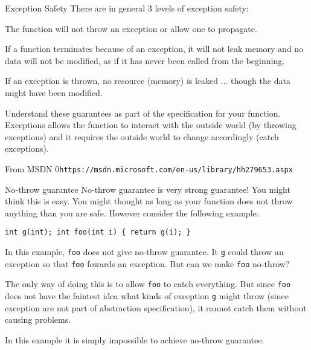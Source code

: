 \begin{frame}[fragile]{Exception Safety}
There are in general 3 levels of exception safety:
\begin{description}
	\item[No-throw Guarantee] The function will not throw an exception or \alert{allow one to propagate}. 
	\item[Strong Guarantee] If a function terminates because of an exception, it will not leak memory and no data will not be modified, as if it has never been called from the beginning.
	\item[Basic Guarantee] If an exception is thrown, no resource (memory) is leaked ... though the data might have been modified.
\end{description}

Understand these guarantees as part of the specification for your function. Exceptions allows the function to interact with the outside world (by throwing exceptions) and it requires the outside world to change accordingly (catch exceptions).

\tiny{From MSDN 0\verb|https://msdn.microsoft.com/en-us/library/hh279653.aspx|}
\end{frame}

\begin{frame}[fragile]{No-throw guarantee}
No-throw guarantee is very strong guarantee! You might think this is easy. You might thought as long as your function does not throw anything than you are safe. However consider the following example:
\begin{verbatim}
int g(int); int foo(int i) { return g(i); }
\end{verbatim}
In this example, \texttt{foo} does not give no-throw guarantee. It \texttt{g} could throw an exception so that \texttt{foo} fowards an exception. But can we make \texttt{foo} no-throw?

\vspace{0.1in}
The only way of doing this is to allow \texttt{foo} to catch everything. But since \texttt{foo} does not have the faintest idea what kinds of exception \texttt{g} might throw (since exception are not part of abstraction specification), it cannot catch them without causing problems. 

\vspace{0.1in}
In this example it is simply impossible to achieve no-throw guarantee.
\end{frame}



